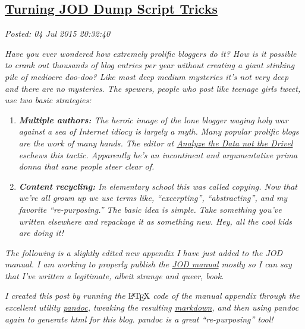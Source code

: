 %

\subsection*{\href{https://bakerjd99.wordpress.com/2015/07/04/turning-jod-dump-script-tricks/}{Turning JOD Dump Script Tricks}}


\noindent\emph{Posted: 04 Jul 2015 20:32:40}
\vspace{6pt}

\emph{Have you ever wondered how extremely prolific bloggers do it? How
is it possible to crank out thousands of blog entries per year without
creating a giant stinking pile of mediocre doo-doo? Like most deep
medium mysteries it's not very deep and there are no mysteries. The
spewers, people who post like teenage girls tweet, use two basic
strategies:}

\begin{enumerate}
\itemsep1pt\parskip0pt
\item
  \emph{\textbf{Multiple authors:} The heroic image of the lone blogger
  waging holy war against a sea of Internet idiocy is largely a myth.
  Many popular prolific blogs are the work of many hands. The editor at
  \href{https://bakerjd99.wordpress.com/}{Analyze the Data not the
  Drivel} eschews this tactic. Apparently he's an incontinent and
  argumentative prima donna that sane people steer clear of.}
\item
  \emph{\textbf{Content recycling:} In elementary school this was called
  copying. Now that we're all grown up we use terms like,
  ``excerpting'', ``abstracting'', and my favorite ``re-purposing.'' The
  basic idea is simple. Take something you've written elsewhere and
  repackage it as something new. Hey, all the cool kids are doing it!}
\end{enumerate}

\emph{The following is a slightly edited new appendix I have just added
to the JOD manual. I am working to properly publish the
\href{https://github.com/bakerjd99/jod/blob/master/joddocument/pdfdoc/jod.pdf}{JOD manual} mostly so I can
say that I've written a legitimate, albeit strange and queer, book.}

\emph{I created this post by running the} $\LaTeX$ \emph{code of the
manual appendix through the excellent utility
\href{http://pandoc.org/}{pandoc}, tweaking the resulting
\href{http://daringfireball.net/projects/markdown/syntax}{markdown}, and
then using pandoc again to generate html for this blog. pandoc is a
great ``re-purposing'' tool!}

